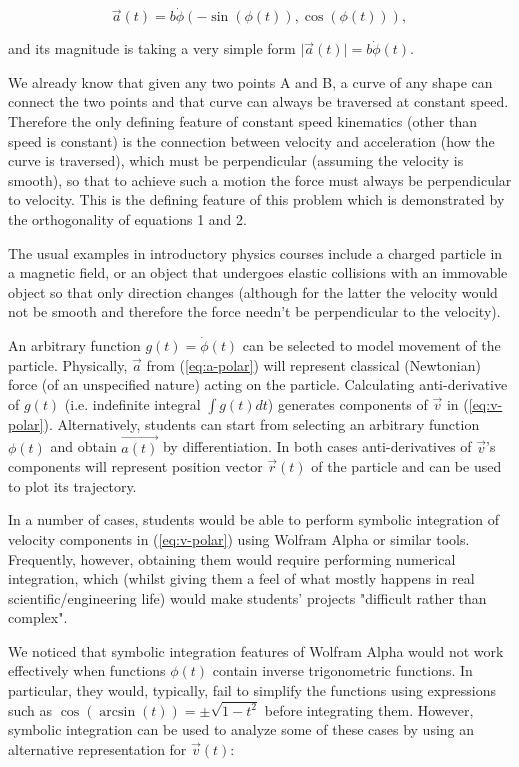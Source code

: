 \documentclass[journal]{IEEEtran}
\begin{document}
\begin{equation}
\vec{a}(t)= b \dot{\phi}(-\sin (\phi (t)), \cos (\phi (t)) ),
\label{eq:a-polar}
\end{equation}

and its magnitude is taking a very simple form $\vert \vec{a}(t) \vert = b\dot{\phi}(t)$.

\par We already know that given any two points A and B, a curve of any shape can connect the two points and that curve can always be traversed at constant speed.  Therefore the only defining feature of constant speed kinematics (other than speed is constant) is the connection between velocity and acceleration (how the curve is traversed), which must be perpendicular (assuming the velocity is smooth), so that to achieve such a motion the force must always be perpendicular to velocity. This is the defining feature of this problem which is demonstrated by the  orthogonality of equations 1 and 2.

The usual examples in introductory physics courses include a charged particle in a magnetic field, or an object that undergoes elastic collisions with an immovable object so that only direction changes (although for the latter the velocity would not be smooth and therefore the force needn't be perpendicular to the velocity).

An arbitrary function $g(t)= \dot{\phi}(t)$ can be selected to model movement of the particle. Physically, $\vec{a}$ from (\ref{eq:a-polar}) will represent classical (Newtonian) force (of an unspecified nature) acting on the particle. Calculating anti-derivative of $g(t)$ (i.e. indefinite integral $\int g(t) dt $) generates components of $\vec{v}$ in (\ref{eq:v-polar}). Alternatively, students can start from selecting an arbitrary function $\phi (t)$ and obtain $\vec{a(t)}$ by differentiation. In both cases anti-derivatives of $\vec{v}$'s components will represent position vector $\vec{r}(t)$ of the particle and can be used to plot its trajectory.

In a number of cases, students would be able to perform symbolic integration of velocity components in (\ref{eq:v-polar}) using Wolfram Alpha or similar tools. Frequently, however, obtaining them would require performing numerical integration, which (whilst giving them a feel of what mostly happens in real scientific/engineering life) would make students' projects "difficult rather than complex".

We noticed that symbolic integration features of Wolfram Alpha would not work effectively when functions $\phi(t)$ contain inverse trigonometric functions. In particular, they would, typically, fail to simplify the functions using expressions such as $\cos(\arcsin(t))=\pm\sqrt{1-t^2}$ before integrating them.  However, symbolic  integration can be used to analyze some of these cases by using an alternative representation for $\vec{v}(t)$:
\end{document}
